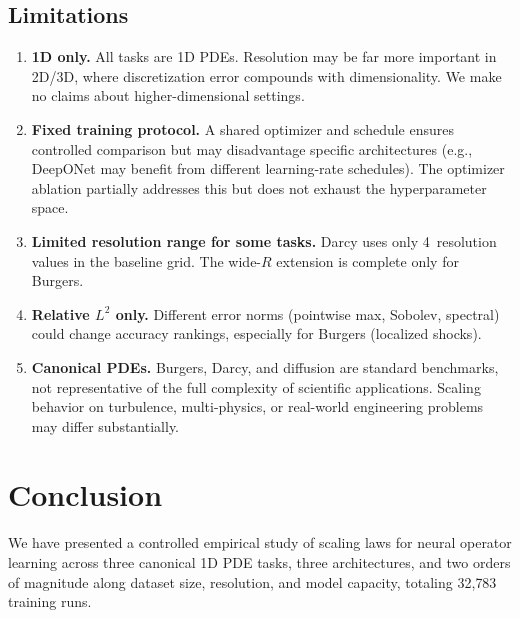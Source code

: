 \documentclass[11pt]{article}
\newcommand{\totalRuns}{32{,}783}
\begin{document}
\subsection{Limitations}
\label{sec:limitations}

\begin{enumerate}[leftmargin=*,itemsep=2pt]
  \item \textbf{1D only.} All tasks are 1D PDEs.
    Resolution may be far more important in 2D/3D, where
    discretization error compounds with dimensionality.
    We make no claims about higher-dimensional settings.

  \item \textbf{Fixed training protocol.} A shared optimizer and
    schedule ensures controlled comparison but may disadvantage
    specific architectures (e.g., DeepONet may benefit from different
    learning-rate schedules). The optimizer ablation partially
    addresses this but does not exhaust the hyperparameter space.

  \item \textbf{Limited resolution range for some tasks.}
    Darcy uses only 4~resolution values in the baseline grid.
    The wide-$R$ extension is complete only for Burgers.

  \item \textbf{Relative $L^2$ only.}
    Different error norms (pointwise max, Sobolev, spectral)
    could change accuracy rankings, especially for Burgers
    (localized shocks).

  \item \textbf{Canonical PDEs.}
    Burgers, Darcy, and diffusion are standard benchmarks, not
    representative of the full complexity of scientific applications.
    Scaling behavior on turbulence, multi-physics, or real-world
    engineering problems may differ substantially.
\end{enumerate}


\section{Conclusion}
\label{sec:conclusion}

We have presented a controlled empirical study of scaling laws for
neural operator learning across three canonical 1D PDE tasks,
three architectures, and two orders of magnitude along dataset size,
resolution, and model capacity, totaling \totalRuns{} training runs.
\end{document}
